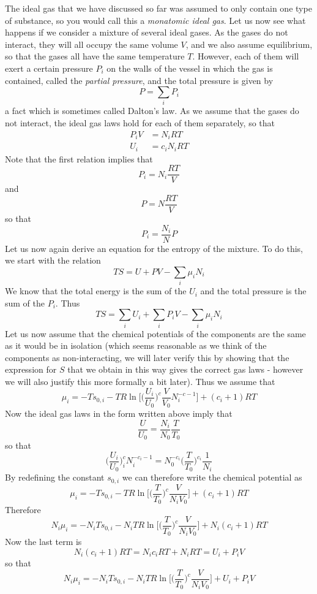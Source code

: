 \documentclass[a4paper, draft]{article}
\theoremstyle{own}
\theoremstyle{remark}
\begin{document}
The ideal gas that we have discussed so far was assumed to only contain one type of substance, so you would call this a {\em monatomic ideal gas}. Let us now see what happens if we consider a mixture of several ideal gases. As the gases do not interact, they will all occupy the same volume $V$, and we also assume equilibrium, so that the gases all have the same temperature $T$. However, each of them will exert a certain pressure $P_i$ on the walls of the vessel in which the gas is contained, called the {\em partial pressure}, and the total pressure is given by
$$
P = \sum_i P_i
$$
a fact which is sometimes called Dalton's law. As we assume that the gases do not interact, the ideal gas laws hold for each of them separately, so that
\begin{align*}
P_i V &= N_i R T \\
U_i &= c_i N_i R T
\end{align*}
Note that the first relation implies that
$$
P_i = N_i \frac{RT}{V} 
$$
and
$$
P = N \frac{RT}{V} 
$$
so that
$$
P_i = \frac{N_i}{N} P
$$
Let us now again derive an equation for the entropy of the mixture. To do this, we start with the relation
$$
TS = U + PV - \sum_i \mu_i N_i
$$
We know that the total energy is the sum of the $U_i$ and the total pressure is the sum of the $P_i$. Thus 
$$
TS = \sum_i U_i + \sum_i P_i V - \sum_i \mu_i N_i
$$
Let us now assume that the chemical potentials of the components are the same as it would be in isolation (which seems reasonable as we think of the components as non-interacting, we will later verify this by showing that the expression for $S$ that we obtain in this way gives the correct gas laws - however we will also justify this more formally a bit later). Thus we assume that
$$
\mu_i = -T s_{0, i} - T R \ln \big[ \big( \frac{U_i}{U_0} \big)^c \frac{V}{V_0} N_i^{-c - 1}  \big] + (c_i+1) RT
$$
Now the ideal gas laws in the form written above imply that
$$
\frac{U}{U_0} = \frac{N_i}{N_0} \frac{T}{T_0}
$$
so that
$$
\big( \frac{U_i}{U_0} \big)^c_i  N_i^{-c_i - 1} = N_0^{-c_i}  \big(  \frac{T}{T_0} \big)^{c_i} \frac{1}{N_i}
$$
By redefining the constant $s_{0,i}$ we can therefore write the chemical potential as
$$
\mu_i = -T s_{0, i} - T R \ln \big[ \big(  \frac{T}{T_0} \big)^{c} \frac{V}{N_i V_0} \big] + (c_i+1) RT
$$
Therefore
$$
N_i \mu_i = - N_i T s_{0, i} - N_i T R \ln \big[ \big(  \frac{T}{T_0} \big)^{c} \frac{V}{N_i V_0} \big] + N_i (c_i+1) RT
$$
Now the last term is
$$
N_i (c_i+1) RT = N_i c_i R T + N_i R T = U_i + P_i V
$$
so that
$$
N_i \mu_i = - N_i T s_{0, i} - N_i T R \ln \big[ \big(  \frac{T}{T_0} \big)^{c} \frac{V}{N_i V_0} \big] + U_i + P_i V
$$
\end{document}
